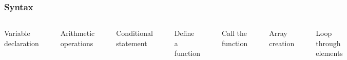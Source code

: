 \documentclass[aspectratio=169]{beamer} %
\begin{document}
\begin{frame}[fragile]
  \frametitle{Syntax}
  
  \begin{columns}[t]
  Variable declaration
  \begin{verbatim}
  a = 10
  b = 20
\end{verbatim}

Arithmetic operations
\begin{verbatim}
  sum = a + b
  product = a * b
  quotient = a / b
\end{verbatim}
Conditional statement
\begin{verbatim}
  age = 25
  if age >= 18
    println("You're an adult.")
  else
    println("You're a minor.")
  end
  \end{verbatim}
  
  Define a function
  \begin{verbatim}
  function greet(name)
    println("Hello ", name)
  end
\end{verbatim}
Call the function
\begin{verbatim}
  greet("Julia")
\end{verbatim}
Array creation
\begin{verbatim}
  numbers = [1, 2, 3, 4, 5]
\end{verbatim}
Loop through elements  
\begin{verbatim}
  for num in numbers
    println(num)
  end
  \end{verbatim}
  \end{columns}
  
  \end{frame}
\end{document}
